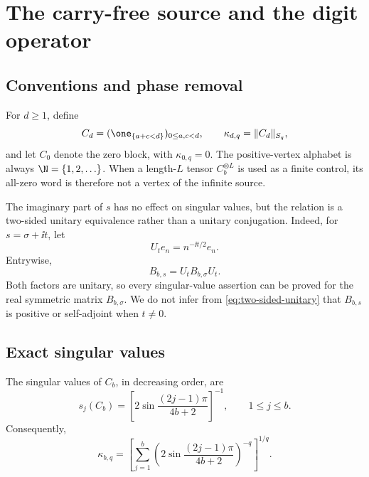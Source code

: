 \section{The carry-free source and the digit operator}
\label{sec:digit}

\subsection{Conventions and phase removal}

For \(d\ge1\), define
\[
  C_d=(\one_{\{a+c<d\}})_{0\le a,c<d},
  \qquad
  \kappa_{d,q}=\|C_d\|_{S_q},
\]
and let \(C_0\) denote the zero block, with \(\kappa_{0,q}=0\).  The
positive-vertex alphabet is always \(\N=\{1,2,\ldots\}\).  When a
length-\(L\) tensor \(C_b^{\otimes L}\) is used as a finite control, its
all-zero word is therefore not a vertex of the infinite source.

The imaginary part of \(s\) has no effect on singular values, but the
relation is a two-sided unitary equivalence rather than a unitary
conjugation.  Indeed, for \(s=\sigma+\ii t\), let
\[
  U_te_n=n^{-\ii t/2}e_n.
\]
Entrywise,
\begin{equation}
  B_{b,s}=U_t B_{b,\sigma}U_t.
  \label{eq:two-sided-unitary}
\end{equation}
Both factors are unitary, so every singular-value assertion can be proved
for the real symmetric matrix \(B_{b,\sigma}\).  We do not infer from
\cref{eq:two-sided-unitary} that \(B_{b,s}\) is positive or self-adjoint
when \(t\ne0\).

\subsection{Exact singular values}

\begin{proposition}
\label{prop:digit-spectrum}
The singular values of \(C_b\), in decreasing order, are
\begin{equation}
  s_j(C_b)=
  [
    2\sin\frac{(2j-1)\pi}{4b+2}
  ]^{-1},
  \qquad 1\le j\le b.
  \label{eq:digit-spectrum}
\end{equation}
Consequently,
\begin{equation}
  \kappa_{b,q}
  =
  [
    \sum_{j=1}^{b}
    (
      2\sin\frac{(2j-1)\pi}{4b+2}
    )^{-q}
  ]^{1/q}.
  \label{eq:kappa-explicit}
\end{equation}
\end{proposition}

